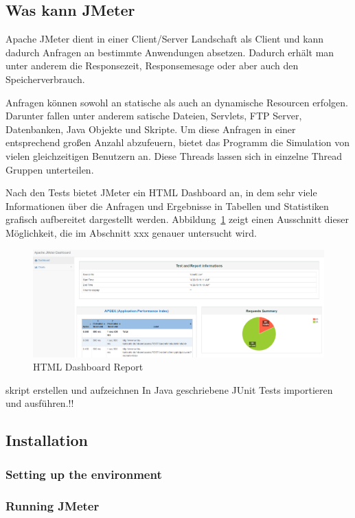 \documentclass[a4paper,12pt]{article}
\begin{document}
\subsection{Was kann JMeter}
Apache JMeter dient in einer Client/Server Landschaft als Client und kann dadurch Anfragen an bestimmte Anwendungen absetzen. Dadurch erhält man unter anderem die Responsezeit, Responsemesage oder aber auch den Speicherverbrauch.

Anfragen können sowohl an statische als auch an dynamische Resourcen erfolgen. Darunter fallen unter anderem satische Dateien, Servlets, FTP Server, Datenbanken, Java Objekte und Skripte.
Um diese Anfragen in einer entsprechend großen Anzahl abzufeuern, bietet das Programm die Simulation von vielen gleichzeitigen Benutzern an. Diese Threads lassen sich in einzelne Thread Gruppen unterteilen.

Nach den Tests bietet JMeter ein HTML Dashboard an, in dem sehr viele Informationen über die Anfragen und Ergebnisse in Tabellen und Statistiken grafisch aufbereitet dargestellt werden. Abbildung~\ref{fig:dashboard} zeigt einen Ausschnitt dieser Möglichkeit, die im Abschnitt xxx genauer untersucht wird.  

\begin{figure}[htb]%
 \centering
    \includegraphics[width=1\textwidth]{bilder/dashboard.png}
  \caption{HTML Dashboard Report}
  \label{fig:dashboard}
\end{figure}
skript erstellen und aufzeichnen
In Java geschriebene JUnit Tests importieren und ausführen.!!

\subsection{Installation}
\subsubsection{Setting up the environment}
\subsubsection{Running JMeter}
\end{document}
